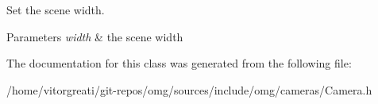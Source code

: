 Set the scene width. 


\begin{DoxyParams}{Parameters}
{\em width} & the scene width \\
\hline
\end{DoxyParams}


The documentation for this class was generated from the following file\+:\begin{DoxyCompactItemize}
\item 
/home/vitorgreati/git-\/repos/omg/sources/include/omg/cameras/Camera.\+h\end{DoxyCompactItemize}
